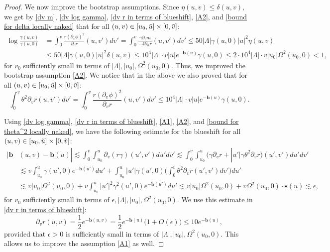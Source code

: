 \documentclass[11pt]{article}
\numberwithin{equation}{section}
\begin{document}
\begin{proof}
We now improve the bootstrap assumptions. Since $\eta(u,v)\leq\delta(u,v),$ we get by \eqref{dv m}, \eqref{dv log gamma}, \eqref{dv r in terms of blueshift}, \eqref{A2}, and \eqref{bound for delta locally naked} that for all $(u,v)\in[u_0,\Tilde{u}]\times[0,\Tilde{v}]$:
\begin{align*}
    \log\frac{\gamma(u,v)}{\gamma(u,0)}&=\int_0^v\frac{r(\partial_v\phi)^2}{\partial_vr}(u,v')dv'=\int_0^v\frac{\gamma\partial_vm}{-4\partial_ur}(u,v')dv'\leq50|\Lambda|\gamma(u,0)|u|^2\eta(u,v)\\
    &\leq50|\Lambda|\gamma(u,0)|u|^2\delta(u,v)\leq10^4|\Lambda|\cdot v|u|e^{-\mathbf{b}(u)}\gamma(u,0)\leq2\cdot10^4|\Lambda|\cdot v|u_0|\Omega^2(u_0,0)<1,
\end{align*}
for $v_0$ sufficiently small in terms of $|\Lambda|,|u_0|,\Omega^2(u_0,0).$ Thus, we improved the bootstrap assumption \eqref{A2}. We notice that in the above we also proved that for all $(u,v)\in[u_0,\Tilde{u}]\times[0,\Tilde{v}]$:
\begin{equation}\label{bound for theta^2 locally naked}
    \int_0^v\theta^2\partial_vr(u,v')dv'=\int_0^v\frac{r(\partial_v\phi)^2}{\partial_vr}(u,v')dv'\leq10^4|\Lambda|\cdot v|u|e^{-\mathbf{b}(u)}\gamma(u,0).
\end{equation}

Using \eqref{dv log gamma}, \eqref{dv r in terms of blueshift}, \eqref{A1}, \eqref{A2}, and \eqref{bound for theta^2 locally naked}, we have the following estimate for the blueshift for all $(u,v)\in[u_0,\Tilde{u}]\times[0,\Tilde{v}]$:
\begin{align*}
    |\mathbf{b}&(u,v)-\mathbf{b}(u)|\lesssim\int_0^v\int_{u_0}^u\partial_v(r\gamma)(u',v')du'dv'\lesssim\int_0^v\int_{u_0}^u\Big(\gamma\partial_vr+|u'|\gamma\theta^2\partial_vr\Big)(u',v')du'dv'\\
    &\lesssim v\int_{u_0}^u\gamma(u',0)e^{-\mathbf{b}(u')}du'+\int_{u_0}^u|u'|\gamma(u',0)\bigg(\int_0^v\theta^2\partial_vr(u',v')dv'\bigg)du'\\
    &\lesssim v|u_0|\Omega^2(u_0,0)+v\int_{u_0}^u|u'|^2\gamma^2(u',0)e^{-\mathbf{b}(u')}du'\lesssim v|u_0|\Omega^2(u_0,0)+v\Omega^2(u_0,0)\cdot\mathbf{s}(u)\lesssim\epsilon,
\end{align*}
for $v_0$ sufficiently small in terms of $\epsilon,|\Lambda|,|u_0|,\Omega^2(u_0,0).$ We use this estimate in \eqref{dv r in terms of blueshift}:
\begin{equation}\label{dv r in terms of b(u)}
    \partial_vr(u,v)=\frac{1}{2}e^{-\mathbf{b}(u,v)}=\frac{1}{2}e^{-\mathbf{b}(u)}\big(1+O(\epsilon)\big)\leq 10e^{-\mathbf{b}(u)},
\end{equation}
provided that $\epsilon>0$ is sufficiently small in terms of $|\Lambda|,|u_0|,\Omega^2(u_0,0).$ This allows us to improve the assumption \eqref{A1} as well.


\end{proof}
\end{document}
